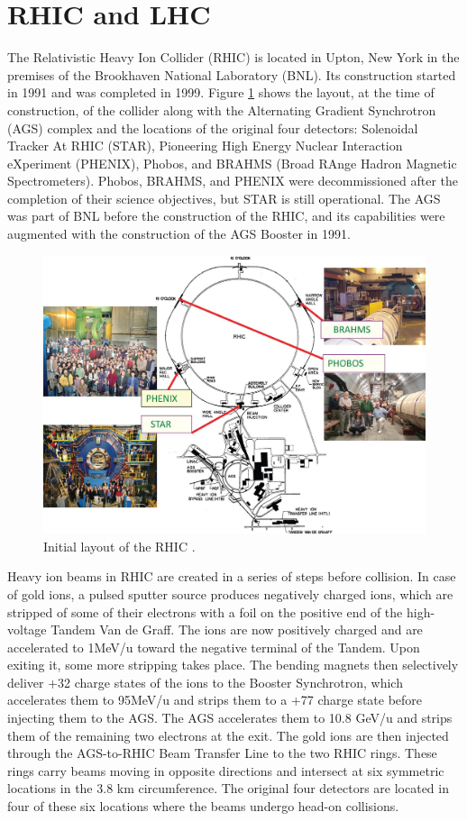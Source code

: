 \section{RHIC and LHC}
The Relativistic Heavy Ion Collider (RHIC) is located in Upton, New York in the premises of the Brookhaven National Laboratory (BNL). Its construction started in 1991 and was completed in 1999. Figure \ref{fig:RHIC_layout} shows the layout, at the time of construction, of the collider along with the Alternating Gradient Synchrotron (AGS) complex and the locations of the original four detectors: Solenoidal Tracker At RHIC (STAR), Pioneering High Energy Nuclear Interaction eXperiment (PHENIX), Phobos, and BRAHMS (Broad RAnge Hadron Magnetic Spectrometers). Phobos, BRAHMS, and PHENIX were decommissioned after the completion of their science objectives, but STAR is still operational. The AGS was part of BNL before the construction of the RHIC, and its capabilities were augmented with the construction of the AGS Booster in 1991.
\begin{figure}[h]
  \centering
  \includegraphics[width=6.5in]{figures/RHIC_Layout.jpeg}
  \caption{Initial layout of the RHIC \cite{doi:10.1093/ptep/ptu093}.}\label{fig:RHIC_layout}
\end{figure}

Heavy ion beams in RHIC are created in a series of steps before collision. In case of gold ions, a pulsed sputter source produces negatively charged ions, which are stripped of some of their electrons with a foil on the positive end of the high-voltage Tandem Van de Graff. The ions are now positively charged and are accelerated to 1MeV/u toward the negative terminal of the Tandem. Upon exiting it, some more stripping takes place. The bending magnets then selectively deliver +32 charge states of the ions to the Booster Synchrotron, which accelerates them to 95MeV/u and strips them to a +77 charge state before injecting them to the AGS. The AGS accelerates them to 10.8 GeV/u and strips them of the remaining two electrons at the exit. The gold ions are then injected through the AGS-to-RHIC Beam Transfer Line to the two RHIC rings. These rings carry beams moving in opposite directions and intersect at six symmetric locations in the 3.8 km circumference. The original four detectors are located in four of these six locations where the beams undergo head-on collisions.


